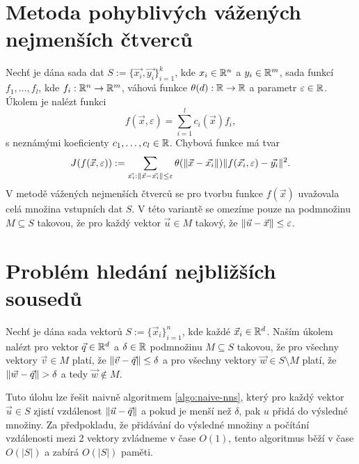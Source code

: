 \section{Metoda pohyblivých vážených nejmenších čtverců}

Nechť je dána sada dat $S := \{\vec{x_i}, \vec{y_i}\}_{i = 1}^k$, kde $x_i \in \mathbb{R}^n$ a $y_i \in \mathbb{R}^m$, sada funkcí $f_1,\ldots,f_l$, kde $f_i: \mathbb{R}^n \rightarrow \mathbb{R}^m$, váhová funkce $\theta(d): \mathbb{R} \rightarrow \mathbb{R}$ a parametr $\varepsilon \in \mathbb{R}$. Úkolem je nalézt funkci
\begin{equation}
  \label{defi:mwls}
  f(\vec{x},\varepsilon) = \sum_{i=1}^lc_i(\vec{x})f_i,
\end{equation}
s neznámými koeficienty $c_1, \ldots, c_l \in \mathbb{R}$. Chybová funkce má tvar
\begin{equation}
  \label{defi:mwls-min}
  J(f(\vec{x},\varepsilon)) := \sum_{\vec{x_i}: \|\vec{x} - \vec{x_i}\| \leq \varepsilon} \theta(\|\vec{x} - \vec{x_i}\|)\|f(\vec{x_i}, \varepsilon) - \vec{y_i}\|^2.
\end{equation}
V metodě vážených nejmenších čtverců se pro tvorbu funkce $f(\vec{x})$ uvažovala celá množina vstupních dat $S$. V této variantě se omezíme pouze na podmnožinu $M \subseteq S$ takovou, že pro každý vektor $\vec{u} \in M$ takový, že $\|\vec{u} - \vec{x}\| \leq \varepsilon$.

\section{Problém hledání nejbližších sousedů}

\begin{defi}
\label{defi:nns}
  Nechť je dána sada vektorů $S := \{\vec{x}_i\}_{i = 1}^n$, kde každé $\vec{x}_i \in \mathbb{R}^d$. Naším úkolem nalézt pro vektor $\vec{q} \in \mathbb{R}^d$ a $\delta \in \mathbb{R}$ podmnožinu $M \subseteq S$ takovou, že pro všechny vektory $\vec{v} \in M$ platí, že $\|\vec{v} - \vec{q}\| \leq \delta$ a pro všechny vektory $\vec{w} \in S \setminus M$ platí, že $\|\vec{w} - \vec{q}\| > \delta$ a tedy $\vec{w} \not\in M$.
\end{defi}

Tuto úlohu lze řešit naivně algoritmem \ref{algo:naive-nns}, který pro každý vektor $\vec{u} \in S$ zjistí vzdálenost $\|\vec{u} - \vec{q}\|$ a pokud je menší než $\delta$, pak $u$ přidá do výsledné množiny. Za předpokladu, že přidávání do výsledné množiny a počítání vzdálenosti mezi 2 vektory zvládneme v čase $O(1)$, tento algoritmus běží v čase $O(|S|)$ a zabírá $O(|S|)$ paměti.

